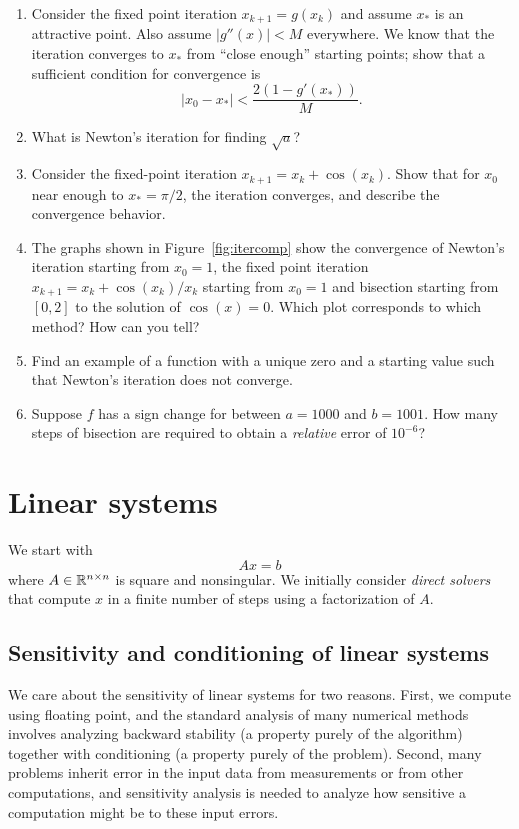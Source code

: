 \documentclass[12pt, leqno]{article}
\begin{document}
\begin{enumerate}
\item
  Consider the fixed point iteration $x_{k+1} = g(x_k)$ and assume
  $x_*$ is an attractive point.  Also assume $|g''(x)| < M$
  everywhere.  We know that the iteration converges to $x_*$ from
  ``close enough'' starting points; show that a sufficient condition
  for convergence is
  \[
    |x_0-x_*| < \frac{2(1-g'(x_*))}{M}.
  \]
\item
  What is Newton's iteration for finding $\sqrt{a}$?
\item
  Consider the fixed-point iteration $x_{k+1} = x_k + \cos(x_k)$.
  Show that for $x_0$ near enough to $x_* = \pi/2$, the iteration
  converges, and describe the convergence behavior.
\item
  The graphs shown in Figure~\ref{fig:itercomp} show the convergence
  of Newton's iteration starting from $x_0 = 1$, the fixed point iteration
  $x_{k+1} = x_k + \cos(x_k)/x_k$ starting from $x_0 = 1$
  and bisection starting from $[0,2]$ to the solution of
  $\cos(x) = 0$.  Which plot corresponds to which method?  How can you
  tell?
\item
  Find an example of a function with a unique zero and a starting
  value such that Newton's iteration does not converge.
\item
  Suppose $f$ has a sign change for between $a = 1000$ and $b = 1001$.
  How many steps of bisection are required to obtain a {\em relative}
  error of $10^{-6}$?
\end{enumerate}

\section{Linear systems}

We start with
\[
  Ax = b
\]
where $A \in \mathbb{R}^{n \times n}$ is square and nonsingular.  We
initially consider {\em direct solvers} that compute $x$ in a
finite number of steps using a factorization of $A$.
  
\subsection{Sensitivity and conditioning of linear systems}

We care about the sensitivity of linear systems for two reasons.
First, we compute using floating point, and the standard analysis
of many numerical methods involves analyzing backward stability
(a property purely of the algorithm) together with conditioning
(a property purely of the problem).  Second, many problems inherit
error in the input data from measurements or from other computations,
and sensitivity analysis is needed to analyze how sensitive a
computation might be to these input errors.
\end{document}
